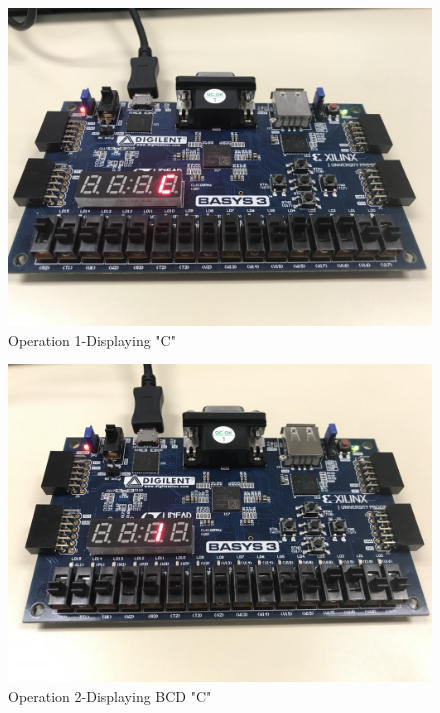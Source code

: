 \documentclass[11pt]{article}
\begin{document}
\begin{figure}[ht]\centering
	\includegraphics[width=1.1\textwidth]{op1.jpg}
	\caption{Operation 1-Displaying "C"}
	\label{fig:sim_with_table}
\end{figure}
\clearpage

\begin{figure}[ht]\centering
	\includegraphics[width=1.1\textwidth]{op2.jpg}
	\caption{Operation 2-Displaying BCD "C"}
	\label{fig:sim_with_table}
\end{figure}
\clearpage
\end{document}
